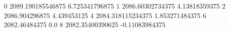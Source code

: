 0 2089.190185546875 6.725341796875
1 2086.60302734375 4.13818359375
2 2086.904296875 4.439453125
4 2084.318115234375 1.853271484375
6 2082.46484375 0.0
8 2082.35400390625 -0.11083984375
